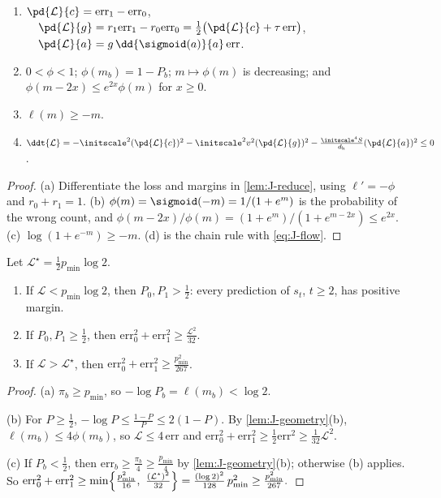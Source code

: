 \begin{lemma}[Derivatives]
\label{lem:J-geometry}
\begin{enumerate}[label=(\alph*),leftmargin=*,itemsep=2pt,topsep=3pt]
\item $\pd{\mathcal L}{c}=\mathrm{err}_1-\mathrm{err}_0$, $\quad\pd{\mathcal L}{g}=r_1\mathrm{err}_1-r_0\mathrm{err}_0=\tfrac{1}{2}\bigl(\pd{\mathcal L}{c}+\tau\,\mathrm{err}\bigr)$, $\quad\pd{\mathcal L}{a}=g\,\dd{\sigmoid(a)}{a}\,\mathrm{err}$.
\item $0<\phi<1$; $\phi(m_b)=1-P_b$; $m\mapsto\phi(m)$ is decreasing; and $\phi(m-2x)\le e^{2x}\phi(m)$ for $x\ge0$.
\item $\ell(m)\ge-m$.
\item $\ddt{\mathcal L}=-\initscale^2(\pd{\mathcal L}{c})^2-\initscale^2v^2(\pd{\mathcal L}{g})^2-\frac{\initscale^4S}{d_{\mathrm h}}(\pd{\mathcal L}{a})^2\le0$.
\end{enumerate}
\end{lemma}

\begin{proof}
(a) Differentiate the loss and margins in \cref{lem:J-reduce}, using $\ell'=-\phi$ and $r_0+r_1=1$.
(b) $\phi(m)=\sigmoid(-m)=1/(1+e^{m})$ is the probability of the wrong count, and
$\phi(m-2x)/\phi(m)=(1+e^{m})/(1+e^{m-2x})\le e^{2x}$.
(c) $\log(1+e^{-m})\ge-m$. (d) is the chain rule with \cref{eq:J-flow}.
\end{proof}

\begin{lemma}
\label{lem:J-levels}
Let $\mathcal L^\star=\frac{1}{2}p_{\min}\log2$.
\begin{enumerate}[label=(\alph*),leftmargin=*,itemsep=2pt,topsep=3pt]
\item If $\mathcal L<p_{\min}\log2$, then $P_0,P_1>\frac{1}{2}$: every prediction of $s_t$, $t\ge2$, has positive margin.
\item If $P_0,P_1\ge\frac{1}{2}$, then $\mathrm{err}_0^2+\mathrm{err}_1^2\ge \frac{\mathcal L^2}{32}$.
\item If $\mathcal L>\mathcal L^\star$, then $\mathrm{err}_0^2+\mathrm{err}_1^2\ge \frac{p_{\min}^2}{267}$.
\end{enumerate}
\end{lemma}

\begin{proof}
(a) $\pi_b\ge p_{\min}$, so $-\log P_b=\ell(m_b)<\log2$.

(b) For $P\ge\frac{1}{2}$, $-\log P\le\frac{1-P}{P}\le2(1-P)$. By \cref{lem:J-geometry}(b), $\ell(m_b)\le4\phi(m_b)$, so $\mathcal L\le4\,\mathrm{err}$ and
$\mathrm{err}_0^2+\mathrm{err}_1^2\ge\frac{1}{2}\mathrm{err}^2\ge\frac{1}{32}\mathcal L^2$.

(c) If $P_b<\frac{1}{2}$, then $\mathrm{err}_b\ge\frac{\pi_b}{4}\ge\frac{p_{\min}}{4}$ by \cref{lem:J-geometry}(b); otherwise (b) applies. So
 $\mathrm{err}_0^2+\mathrm{err}_1^2\ge\min\Bigl\{\frac{p_{\min}^2}{16},\ \frac{(\mathcal L^\star)^2}{32}\Bigr\}=\frac{(\log2)^2}{128}\,p_{\min}^2\ge\frac{p_{\min}^2}{267}. \qedhere$ 
\end{proof}

